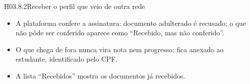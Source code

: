 \begin{historia}{H03.8.2}{Receber o perfil que veio de outra rede}{\pronto}
\aceite
\begin{itemize}
  \item A plataforma confere a assinatura: documento adulterado é recusado; o
    que não pôde ser conferido aparece como \enquote{Recebido, mas não
    conferido}.
  \item O que chega de fora nunca vira nota nem progresso: fica anexado ao
    estudante, identificado pelo CPF.
  \item A lista \enquote{Recebidos} mostra os documentos já recebidos.
\end{itemize}
\end{historia}
